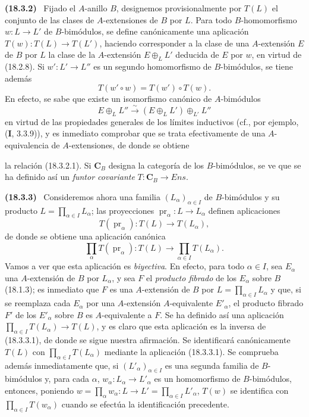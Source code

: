 \documentclass[10pt,oneside]{book}
\makeatletter
\newcommand{\setmanualcurrentlabel}[1]{\def\@currentlabel{#1}}
\newcommand{\oldpage}[2][]{%
  \setcounter{footnote}{0}%
  \marginpar{\scriptsize\textbf{#1}~|~#2}\ignorespaces}
\newenvironment{env}[1][]{\setmanualcurrentlabel{#1}\par\medskip\noindent\textbf{(#1)}\ }{\par}
\makeatother
\begin{document}
\begin{env}[18.3.2]
\label{0.18.3.2-es}
Fijado el $A$-anillo $B$, designemos provisionalmente por $T(L)$ el conjunto
de las clases de $A$-extensiones de $B$ por $L$. Para todo $B$-homomorfismo
$w:L\to L'$ de $B$-bimódulos, se define canónicamente una aplicación
$T(w):T(L)\to T(L')$, haciendo corresponder a la clase de una $A$-extensión
$E$ de $B$ por $L$ la clase de la $A$-extensión $E\oplus_LL'$ deducida de $E$
por $w$, en virtud de (18.2.8). Si $w':L'\to L''$ es un segundo homomorfismo
de $B$-bimódulos, se tiene además
\begin{equation}
\label{0.18.3.2.1-es}
\tag{18.3.2.1}
  T(w'\circ w)=T(w')\circ T(w).
\end{equation}
En efecto, se sabe que existe un isomorfismo canónico de $A$-bimódulos
\[
  E\oplus_LL''\xrightarrow{\sim}(E\oplus_LL')\oplus_{L'}L''
\]
en virtud de las propiedades generales de los límites inductivos (cf., por
ejemplo, (\textbf{I}, 3.3.9)), y es inmediato comprobar que se trata
efectivamente de una $A$-equivalencia de $A$-extensiones, de donde se obtiene

\oldpage[0\textsubscript{IV-1}]{60}

la relación (18.3.2.1). Si $\boldsymbol{C}_B$ designa la categoría de los
$B$-bimódulos, se ve que se ha definido así un \emph{funtor covariante}
$T:\boldsymbol C_B\to\boldsymbol{\mathit{Ens}}$.
\end{env}

\begin{env}[18.3.3]
\label{0.18.3.3-es}
Consideremos ahora una familia $(L_\alpha)_{\alpha\in I}$ de $B$-bimódulos y
su producto $L=\prod_{\alpha\in I}L_\alpha$; las proyecciones
$\operatorname{pr}_\alpha:L\to L_\alpha$ definen aplicaciones
\[
  T(\operatorname{pr}_\alpha):T(L)\to T(L_\alpha),
\]
de donde se obtiene una aplicación canónica
\begin{equation}
\label{0.18.3.3.1-es}
\tag{18.3.3.1}
  \prod_\alpha T(\operatorname{pr}_\alpha):T(L)
  \longrightarrow\prod_{\alpha\in I}T(L_\alpha).
\end{equation}
Vamos a ver que esta aplicación es \emph{biyectiva}. En efecto, para todo
$\alpha\in I$, sea $E_\alpha$ una $A$-extensión de $B$ por $L_\alpha$, y sea
$F$ el \emph{producto fibrado} de los $E_\alpha$ sobre $B$ (18.1.3); es
inmediato que $F$ es una $A$-extensión de $B$ por
$L=\prod_{\alpha\in I}L_\alpha$ y que, si se reemplaza cada $E_\alpha$ por una
$A$-extensión $A$-equivalente $E'_\alpha$, el producto fibrado $F'$ de los
$E'_\alpha$ sobre $B$ es $A$-equivalente a $F$. Se ha definido así una
aplicación $\prod_{\alpha\in I}T(L_\alpha)\to T(L)$, y es claro que esta
aplicación es la inversa de (18.3.3.1), de donde se sigue nuestra afirmación.
Se identificará canónicamente $T(L)$ con
$\prod_{\alpha\in I}T(L_\alpha)$ mediante la aplicación (18.3.3.1). Se
comprueba además inmediatamente que, si $(L'_\alpha)_{\alpha\in I}$ es una
segunda familia de $B$-bimódulos y, para cada $\alpha$,
$w_\alpha:L_\alpha\to L'_\alpha$ es un homomorfismo de $B$-bimódulos,
entonces, poniendo
$w=\prod_\alpha w_\alpha:L\to L'=\prod_{\alpha\in I}L'_\alpha$, $T(w)$ se
identifica con $\prod_{\alpha\in I}T(w_\alpha)$ cuando se efectúa la
identificación precedente.
\end{env}
\end{document}
